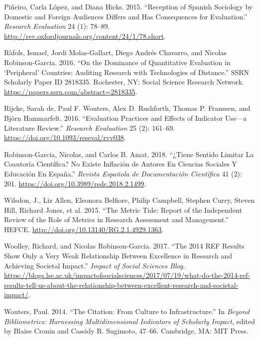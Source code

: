 \documentclass[]{elsarticle} %
\begin{document}
\leavevmode\hypertarget{ref-pineiroReceptionSpanishSociology2015}{}%
Piñeiro, Carla López, and Diana Hicks. 2015. ``Reception of Spanish
Sociology by Domestic and Foreign Audiences Differs and Has Consequences
for Evaluation.'' \emph{Research Evaluation} 24 (1): 78--89.
\url{http://rev.oxfordjournals.org/content/24/1/78.short}.

\leavevmode\hypertarget{ref-rafolsDominanceQuantitativeEvaluation2016}{}%
Ràfols, Ismael, Jordi Molas-Gallart, Diego Andrés Chavarro, and Nicolas
Robinson-Garcia. 2016. ``On the Dominance of Quantitative Evaluation in
`Peripheral' Countries: Auditing Research with Technologies of
Distance.'' SSRN Scholarly Paper ID 2818335. Rochester, NY: Social
Science Research Network.
\url{https://papers.ssrn.com/abstract=2818335}.

\leavevmode\hypertarget{ref-rijckeEvaluationPracticesEffects2016}{}%
Rijcke, Sarah de, Paul F. Wouters, Alex D. Rushforth, Thomas P.
Franssen, and Björn Hammarfelt. 2016. ``Evaluation Practices and Effects
of Indicator Use---a Literature Review.'' \emph{Research Evaluation} 25
(2): 161--69. \url{https://doi.org/10.1093/reseval/rvv038}.

\leavevmode\hypertarget{ref-robinson-garciaTieneSentidoLimitar2018}{}%
Robinson-Garcia, Nicolas, and Carlos B. Amat. 2018. ``¿Tiene Sentido
Limitar La Coautoría Científica? No Existe Inflación de Autores En
Ciencias Sociales Y Educación En España.'' \emph{Revista Española de
Documentación Científica} 41 (2): 201.
\url{https://doi.org/10.3989/redc.2018.2.1499}.

\leavevmode\hypertarget{ref-wilsdonMetricTideReport2015}{}%
Wilsdon, J., Liz Allen, Eleonora Belfiore, Philip Campbell, Stephen
Curry, Steven Hill, Richard Jones, et al. 2015. ``The Metric Tide:
Report of the Independent Review of the Role of Metrics in Research
Assessment and Management.'' HEFCE.
\url{http://doi.org/10.13140/RG.2.1.4929.1363}.

\leavevmode\hypertarget{ref-woolley2014REFResults2017}{}%
Woolley, Richard, and Nicolas Robinson-Garcia. 2017. ``The 2014 REF
Results Show Only a Very Weak Relationship Between Excellence in
Research and Achieving Societal Impact.'' \emph{Impact of Social
Sciences Blog}.
\url{https://blogs.lse.ac.uk/impactofsocialsciences/2017/07/19/what-do-the-2014-ref-results-tell-us-about-the-relationship-between-excellent-research-and-societal-impact/}.

\leavevmode\hypertarget{ref-woutersCitationCultureInfrastructure2014}{}%
Wouters, Paul. 2014. ``The Citation: From Culture to Infrastructure.''
In \emph{Beyond Bibliometrics: Harnessing Multidimensional Indicators of
Scholarly Impact}, edited by Blaise Cronin and Cassidy R. Sugimoto,
47--66. Cambridge, MA: MIT Press.
\end{document}
